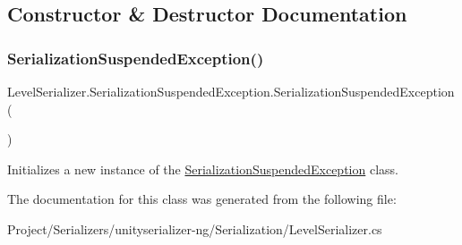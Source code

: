 \subsection{Constructor \& Destructor Documentation}
\mbox{\label{class_level_serializer_1_1_serialization_suspended_exception_ab59fcf4b9e27e555f603656d3af62b2b}} 
\subsubsection{\texorpdfstring{Serialization\+Suspended\+Exception()}{SerializationSuspendedException()}}
{\footnotesize\ttfamily Level\+Serializer.\+Serialization\+Suspended\+Exception.\+Serialization\+Suspended\+Exception (\begin{DoxyParamCaption}{ }\end{DoxyParamCaption})\hspace{0.3cm}{\ttfamily [inline]}}



Initializes a new instance of the \hyperlink{class_level_serializer_1_1_serialization_suspended_exception}{Serialization\+Suspended\+Exception} class. 



The documentation for this class was generated from the following file\+:\begin{DoxyCompactItemize}
\item 
Project/\+Serializers/unityserializer-\/ng/\+Serialization/Level\+Serializer.\+cs\end{DoxyCompactItemize}
